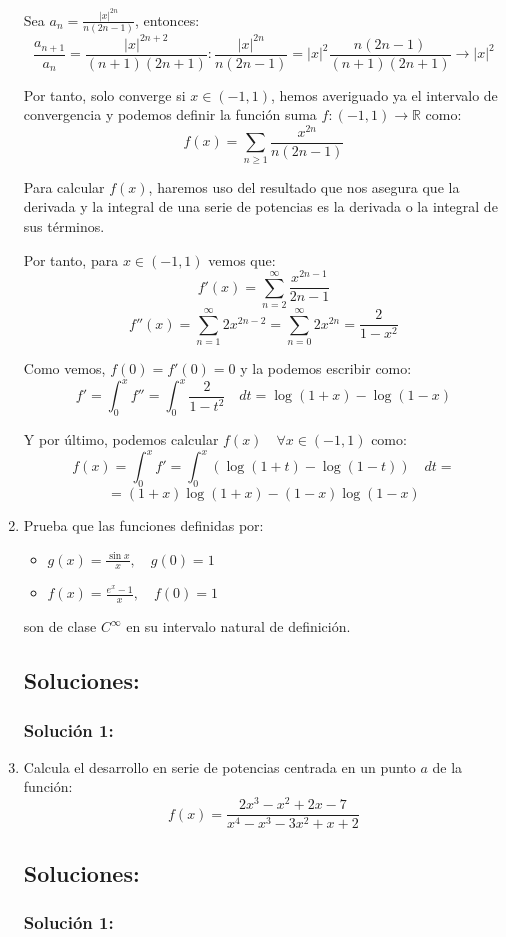 \documentclass[a4paper, 11pt]{article} %
\begin{document}
\begin{enumerate}
	Sea $a_n = \displaystyle{\frac{\vert x\vert^{2n}}{n(2n-1)}}$, entonces:
	$$\frac{a_{n+1}}{a_n} = \frac{|x|^{2n+2}}{(n+1)(2n+1)} : \frac{|x|^{2n}}{n(2n-1)} =
	|x|^2 \frac{n(2n-1)}{(n+1)(2n+1)} \rightarrow |x|^2$$
	
	Por tanto, solo converge si $x \in (-1,1)$, hemos averiguado ya el intervalo de convergencia y podemos
	definir la función suma $f: (-1,1) \rightarrow \mathbb{R}$ como:
	$$f(x)=\sum_{n \geq 1}\frac{x^{2n}}{n(2n-1)}$$
	
	Para calcular $f(x)$, haremos uso del resultado que nos asegura que la derivada y la integral de una
	serie de potencias es la derivada o la integral de sus términos.
	
	Por tanto, para $x \in (-1,1)$ vemos que:
	$$f'(x)=\sum_{n = 2}^\infty \frac{x^{2n-1}}{2n-1}$$
	$$f''(x)=\sum_{n=1}^\infty 2x^{2n-2}=\sum_{n=0}^\infty 2x^{2n}=\frac{2}{1-x^2}$$
	
	Como vemos, $f(0) = f'(0) = 0$ y la podemos escribir como:
	$$f' = \int_0^x f'' = \int_0^x \frac{2}{1-t^2} \quad dt = \log(1+x) - \log(1-x)$$
	
	Y por último, podemos calcular $f(x) \quad \forall x \in (-1,1)$ como:
	$$f(x) = \int_0^x f' = \int_0^x (\log(1+t) - \log(1-t)) \quad dt =$$ $$= (1+x) \log(1+x) - (1-x)\log(1-x)$$
	 
	\item Prueba que las funciones definidas por:
	\begin{itemize}
		\item $\displaystyle{g(x) = \frac{\sin x}{x}, \quad g(0) = 1}$
		\item $\displaystyle{f(x) = \frac{e^x-1}{x}, \quad f(0) = 1}$
	\end{itemize}
	son de clase $\mathit{C}^\infty$ en su intervalo natural de definición.
	\subsection*{Soluciones:}
		\subsubsection*{Solución 1:}
	
	\item Calcula el desarrollo en serie de potencias centrada en un punto $a$ de la función:
	$$\displaystyle{f(x) = \frac{2x^3-x^2+2x-7}{x^4-x^3-3x^2+x+2}}$$
	\subsection*{Soluciones:}
		\subsubsection*{Solución 1:}
	
\end{enumerate}
\end{document}
